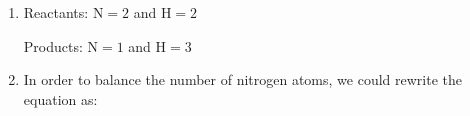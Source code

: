 {\begin{mdframed}[linewidth=4, leftmargin=40, rightmargin=40]
\begin{exercise}
\begin{enumerate}[noitemsep, label=\textbf{Step} \textbf{\arabic*}. ]
        \par 
        \item  
        \label{m38726*id64485}Reactants: \begin{math}\mathrm{N}=2\end{math} and \begin{math}\mathrm{H}=2\end{math}\par 
        \label{m38726*id64488}Products: \begin{math}\mathrm{N}=1\end{math} and \begin{math}\mathrm{H}=3\end{math}\par 
        \item  
        \label{m38726*id64495}In order to balance the number of nitrogen atoms, we could rewrite the equation as:
        \label{m38726*id798543}\nopagebreak\noindent{}
    

\end{enumerate}
\end{exercise}
\end{mdframed}}
